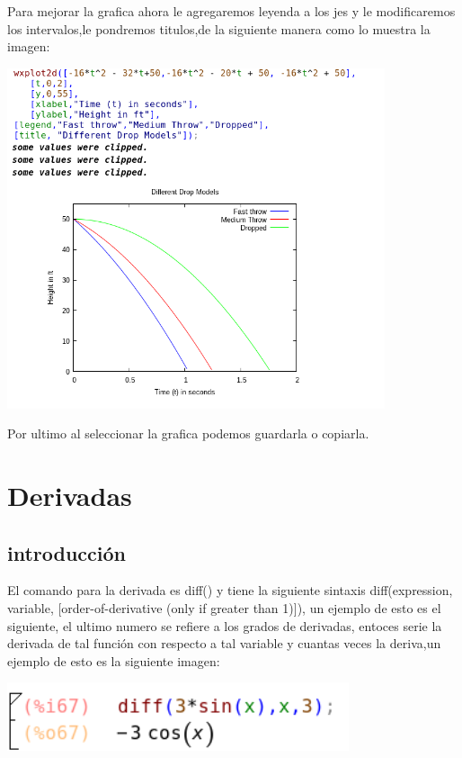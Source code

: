 \documentclass{article}
\begin{document}
Para mejorar la grafica ahora le agregaremos leyenda a los jes y le modificaremos los intervalos,le pondremos titulos,de la siguiente manera como lo muestra la imagen:

\begin{center}
\includegraphics[height=10cm]{fto20.png}
\end{center}


Por ultimo al seleccionar la grafica podemos guardarla o copiarla.


\section{Derivadas}
\subsection{introducción}

El comando para la derivada es diff() y tiene la siguiente sintaxis diff(expression, variable, [order-of-derivative (only if greater than 1)]), un ejemplo de esto es el siguiente, el ultimo numero se refiere a los grados de derivadas, entoces serie la derivada de tal función con respecto a tal variable y cuantas veces la deriva,un ejemplo de esto es la siguiente imagen:

\begin{center}
\includegraphics[height=2cm]{fto22.png}
\end{center}
\end{document}
